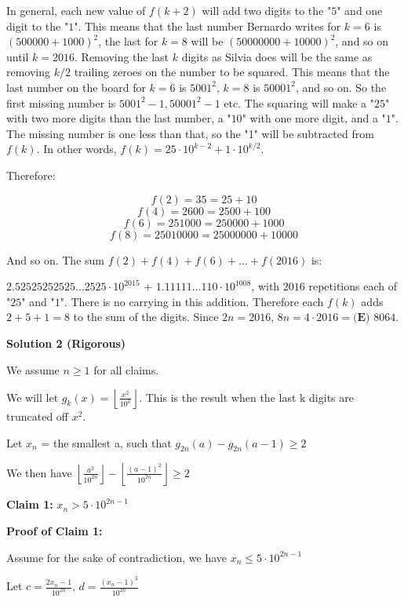 \begin{enumerate}
 In general, each new value of $f(k+2)$ will add two digits to the "$5$" and one digit to the "$1$". This means that the last number Bernardo writes for $k=6$ is $\left(500000+1000\right)^2$, the last for $k = 8$ will be $\left(50000000+10000\right)^2$, and so on until $k=2016$. Removing the last $k$ digits as Silvia does will be the same as removing $k/2$ trailing zeroes on the number to be squared. This means that the last number on the board for $k=6$ is $5001^2$, $k=8$ is $50001^2$, and so on. So the first missing number is $5001^2-1,50001^2-1\text{ etc.}$ The squaring will make a "$25$" with two more digits than the last number, a "$10$" with one more digit, and a "$1$". The missing number is one less than that, so the "1" will be subtracted from $f(k)$. In other words, $f(k) = 25\cdot 10^{k-2}+1\cdot 10^{k/2}$.

 Therefore:

 
 \[f(2) =35 =25 +10\]
 \[f(4) =2600 =2500 +100\]
 \[f(6) =251000 =250000 +1000\]
 \[f(8) = 25010000 = 25000000 + 10000\]

 And so on. The sum $f(2) + f(4) + f(6) +\dots + f(2016)$ is:

 $2.52525252525\dots 2525\cdot 10^{2015}$ + $1.11111\dots 110\cdot 10^{1008}$, with $2016$ repetitions each of "$25$" and "$1$". There is no carrying in this addition. Therefore each $f(k)$ adds $2 + 5 + 1 = 8$ to the sum of the digits. Since $2n = 2016$, $8n = 4\cdot 2016 = \boxed{\textbf{(E)}\text{ 8064}}$.

 



\textbf{Solution 2 (Rigorous)}

We assume $n \geq 1$ for all claims.

 We will let $g_k(x) = \left \lfloor \frac{x^2}{10^k}\right \rfloor$. This is the result when the last k digits are truncated off $x^2$.

 Let $x_n$ = the smallest a, such that $g_{2n}(a) - g_{2n}(a-1) \geq 2$ 

 We then have $\left \lfloor \frac{a^2}{10^{2n}} \right \rfloor - \left \lfloor \frac{(a-1)^2}{10^{2n}} \right \rfloor \geq 2$

 \textbf{Claim 1:} $x_n > 5\cdot10^{2n-1}$

 \textbf{Proof of Claim 1:}

 Assume for the sake of contradiction, we have $x_n \leq 5 \cdot 10^{2n-1}$

 Let $c = \frac{2x_n - 1}{10^{2n}}$, $d = \frac{(x_n-1)^2}{10^{2n}}$


\end{enumerate}
